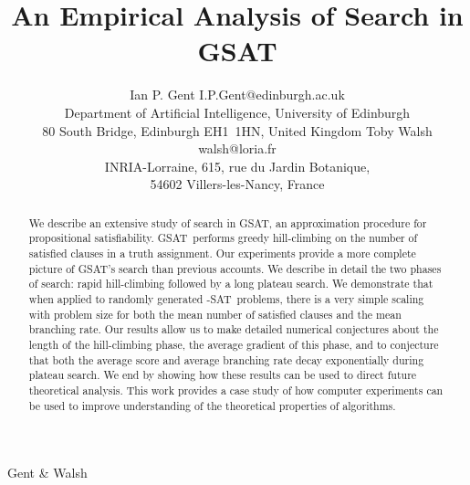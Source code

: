 
{Gent \& Walsh}


\def\GSAT{{\sc GSAT}}
\def\CSAT{{\sc CSAT}}
\def\GenSAT{{\sc GenSAT}}
\def\SAT{{\sc SAT}}
\def\kSAT{{\sc $k$-SAT}}
\def\3SAT{{\sc 3-SAT}}
\def\N{\mbox{\rm N}}
\def\NN{\mbox{\rm \tiny N}}
\def\L{\mbox{\rm L}}
\def\LL{\mbox{\rm \scriptsize L}}
\newcommand{\secref}[1]{\S \ref{#1}}



\title{An Empirical Analysis of Search in GSAT}
\author{\name Ian P. Gent \email I.P.Gent@edinburgh.ac.uk \\
	\addr Department of Artificial Intelligence,
University of Edinburgh \\
80 South Bridge,
Edinburgh EH1~1HN,  United Kingdom 
\AND 
\name Toby Walsh  \email walsh@loria.fr \\
\addr INRIA-Lorraine,
615, rue du Jardin Botanique, \\
54602 Villers-les-Nancy, France
}

\maketitle

\vspace{-0.075cm}

\begin{abstract} 
We describe an extensive study of search in
\GSAT, an approximation procedure for propositional
satisfiability. \GSAT\ performs greedy hill-climbing on
the number of satisfied clauses in a truth assignment.
Our experiments provide a more complete picture of
\GSAT's search than previous accounts. We describe
in detail the two phases of search: rapid hill-climbing followed
by a long plateau search. 
We demonstrate that when applied to 
randomly generated \3SAT\ problems, there is a 
very simple scaling with problem size for both the mean number 
of satisfied clauses and the mean branching rate.
Our results allow us to
make detailed numerical conjectures about
the length of the hill-climbing phase, 
the average gradient of this
phase, and to conjecture that both the average score and average
branching rate decay exponentially during plateau search. 
We end by showing how these results can
be used to direct future theoretical analysis. 
This work provides a case study of how computer experiments
can be used to improve understanding of the 
theoretical properties of algorithms.
\end{abstract}


